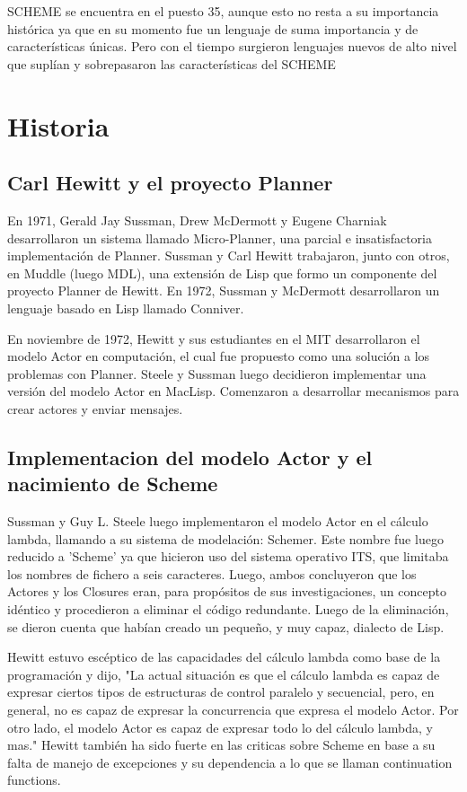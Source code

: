 \documentclass[11pt]{article} %
\begin{document}
SCHEME se encuentra en el puesto 35, aunque esto no resta a su importancia histórica ya que en su momento fue un lenguaje de suma importancia y de características únicas. Pero con el tiempo surgieron lenguajes nuevos de alto nivel que suplían y sobrepasaron las características del SCHEME

\section{Historia}
\subsection{Carl Hewitt y el proyecto Planner}

En 1971, Gerald Jay Sussman, Drew McDermott y Eugene Charniak desarrollaron un sistema llamado Micro-Planner, una parcial e insatisfactoria implementación de Planner. Sussman y Carl Hewitt trabajaron, junto con otros, en Muddle (luego MDL), una extensión de Lisp que formo un componente del proyecto Planner de Hewitt. En 1972, Sussman y McDermott desarrollaron un lenguaje basado en Lisp llamado Conniver.

En noviembre de 1972, Hewitt y sus estudiantes en el MIT desarrollaron el modelo Actor en computación, el cual fue propuesto como una solución a los problemas con Planner. Steele y Sussman luego decidieron implementar una versión del modelo Actor en MacLisp. Comenzaron a desarrollar mecanismos para crear actores y enviar mensajes.

\subsection{Implementacion del modelo Actor y el nacimiento de Scheme}

Sussman y Guy L. Steele luego implementaron el modelo Actor en el cálculo lambda, llamando a su sistema de modelación: Schemer. Este nombre fue luego reducido a 'Scheme' ya que hicieron uso del sistema operativo ITS, que limitaba los nombres de fichero a seis caracteres. Luego, ambos concluyeron que los Actores y los Closures eran, para propósitos de sus investigaciones, un concepto idéntico y procedieron a eliminar el código redundante. Luego de la eliminación, se dieron cuenta que habían creado un pequeño, y muy capaz, dialecto de Lisp.

Hewitt estuvo escéptico de las capacidades del cálculo lambda como base de la programación y dijo, "La actual situación es que el cálculo lambda es capaz de expresar ciertos tipos de estructuras de control paralelo y secuencial, pero, en general, no es capaz de expresar la concurrencia que expresa el modelo Actor. Por otro lado, el modelo Actor es capaz de expresar todo lo del cálculo lambda, y mas." Hewitt también ha sido fuerte en las criticas sobre Scheme en base a su falta de manejo de excepciones y su dependencia a lo que se llaman continuation functions.
\end{document}
